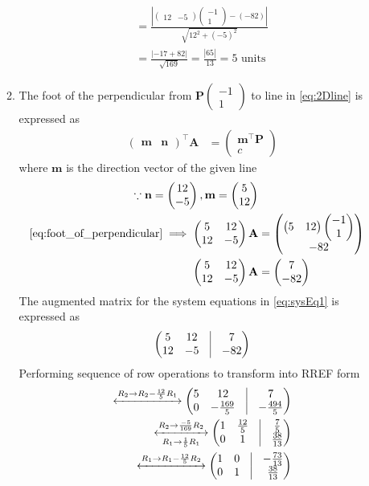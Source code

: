 \documentclass[12pt]{article}
\providecommand{\brak}[1]{\ensuremath{\left(#1\right)}}
\newcommand{\myvec}[1]{\ensuremath{\begin{pmatrix}#1\end{pmatrix}}}
\providecommand{\abs}[1]{\left\vert#1\right\vert}
\let\vec\mathbf
\begin{document}
\begin{enumerate}
\begin{enumerate}
\begin{align}
	= \frac{\abs{  \myvec{12 & -5 }\myvec{-1 \\ 1}-\brak{-82} }}{\sqrt{12^2+\brak{-5}^2}} \\	
	= \frac{\abs{  -17 + 82 }}{\sqrt{169}}	
	= \frac{\abs{65 }}{13}
	= 5 \text{ units }
\end{align}
\item The foot of the perpendicular from $\vec{P}\myvec{-1 \\ 1}$ to line in \eqref{eq:2Dline} is expressed as
\begin{align}
	\label{eq:foot_of_perpendicular}
	\myvec{\vec{m} & \vec{n}}^\top\vec{A} &= 
	   \myvec{
              \vec{m}^\top\vec{P}\\
	      c
	      }
\end{align}
where $\vec{m}$ is the direction vector of the given line
\begin{align}
    \because \vec{n} = \myvec{ 12 \\ -5},   
    \vec{m} = \myvec{ 5 \\ 12} \\ 
	\eqref{eq:foot_of_perpendicular} \implies \myvec{5&12 \\ 12 & -5}\vec{A} &= \myvec{\myvec{5 & 12}\myvec{-1 \\ 1}\\ -82} \\
	\label{eq:sysEq1}
	\myvec{5&12 \\ 12 & -5}\vec{A} &= \myvec{7 \\ -82} 
\end{align}	
The augmented matrix for the system equations in \eqref{eq:sysEq1} is expressed as
\begin{align}
	\myvec{5&12 & \vrule & 7 \\ 12 & -5 & \vrule & -82} 
\end{align}
Performing sequence of row operations to transform into RREF form
\begin{align}
        \xleftrightarrow[]{{R_2\rightarrow R_2-\frac{12}{5}R_1}}  
	\myvec{5&12 & \vrule & 7 \\ 0 & -\frac{169}{5} & \vrule & -\frac{494}{5}} \\
	\xleftrightarrow[{R_1\rightarrow \frac{1}{5}}R_1]{{R_2\rightarrow \frac{-5}{169}R_2}}  
	\myvec{1 & \frac{12}{5} & \vrule & \frac{7}{5} \\ 0 & 1 & \vrule & \frac{38}{13}} \\
	\xleftrightarrow[]{{R_1\rightarrow R_1-\frac{12}{5}R_2}}  
	\myvec{1 & 0 & \vrule & -\frac{73}{13} \\ 0 & 1 & \vrule & \frac{38}{13}} \\

\end{align}
\end{enumerate}
\end{enumerate}
\end{document}
